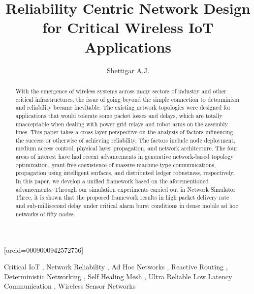 \documentclass[a4paper,fleqn]{cas-dc}
\numberwithin{equation}{section}
\begin{document}
\let\WriteBookmarks\relax
\def\floatpagepagefraction{1}
\def\textpagefraction{.001}


\title[mode = title]{Reliability Centric Network Design for Critical Wireless IoT Applications}

\author[1]{Shettigar A.J.}[orcid=0009000942572756]
\cormark[1]
\address[1]{School of Computer Science and Engineering, VIT AP University, Amaravati, Andhra Pradesh, India}


\begin{abstract}
With the emergence of wireless systems across many sectors of industry and other critical infrastructures, the issue of going beyond the simple connection to determinism and reliability became inevitable. The existing network topologies were designed for applications that would tolerate some packet losses and delays, which are totally unacceptable when dealing with power grid relays and robot arms on the assembly lines. This paper takes a cross-layer perspective on the analysis of factors influencing the success or otherwise of achieving reliability. The factors include node deployment, medium access control, physical layer propagation, and network architecture. The four areas of interest have had recent advancements in generative network-based topology optimization, grant-free coexistence of massive machine-type communications, propagation using intelligent surfaces, and distributed ledger robustness, respectively. In this paper, we develop a unified framework based on the aforementioned advancements. Through our simulation experiments carried out in Network Simulator Three, it is shown that the proposed framework results in high packet delivery rate and sub-millisecond delay under critical alarm burst conditions in dense mobile ad hoc networks of fifty nodes.
\end{abstract}

\begin{keywords}
Critical IoT \sep
Network Reliability \sep
Ad Hoc Networks \sep
Reactive Routing \sep
Deterministic Networking \sep
Self Healing Mesh \sep
Ultra Reliable Low Latency Communication \sep
Wireless Sensor Networks
\end{keywords}

\maketitle
\end{document}
